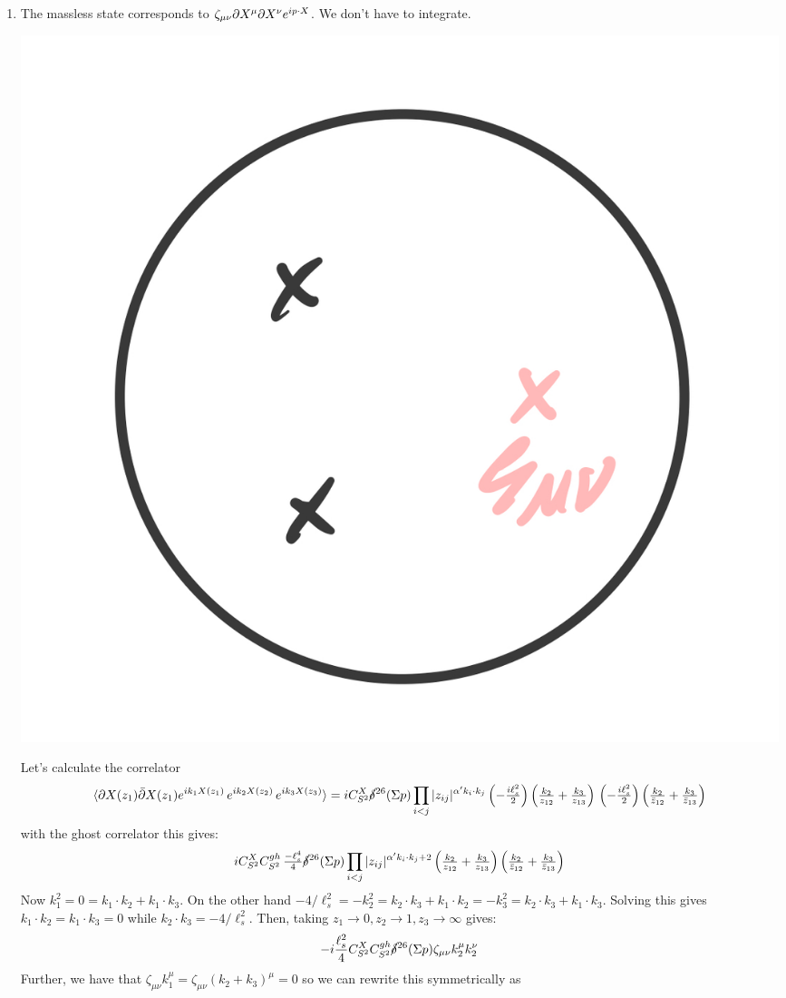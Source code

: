 \documentclass[11pt, class=article, crop=false]{standalone}
\begin{document}
\begin{enumerate}
	
	\item The massless state corresponds to $\zeta_{\mu \nu} \partial X^\mu \partial X^\nu e^{i p \cdot X}$. We don't have to integrate. 
	\begin{center}
		\includegraphics[scale=0.1]{"Drawings/55"}
	\end{center}
	Let's calculate the correlator
	\[
		\braket{\partial X(z_1) \bar {\partial} X(z_1) e^{i k_1 X(z_1)}\,  e^{i k_2 X(z_2)} \,  e^{i k_3 X(z_3)} } 
		= i C_{S^2}^X \cancel\delta^{26}(\Sigma p) \prod_{i<j} |z_{ij}|^{\alpha' k_i \cdot k_j} \left(-\tfrac{i \ell_s^2}{2}\right) \left(\tfrac{k_2}{z_{12}} + \tfrac{k_3}{z_{13}}\right) \, \left(-\tfrac{i\ell_s^2}{2}\right) \left(\tfrac{k_2}{\bar z_{12}} + \tfrac{k_3}{\bar z_{13}}\right)
	\]
	with the ghost correlator this gives:
	\[
		i C_{S^2}^X C_{S^2}^{gh} \, \tfrac{-\ell_s^4}{4} \cancel\delta^{26}(\Sigma p) \prod_{i<j} |z_{ij}|^{\alpha' k_i \cdot k_j + 2} \left(\tfrac{k_2}{z_{12}} + \tfrac{k_3}{z_{13}}\right)  \left(\tfrac{k_2}{\bar z_{12}} + \tfrac{k_3}{\bar z_{13}}\right)
	\]
	Now $k_1^2 = 0 = k_1 \cdot k_2 + k_1 \cdot k_3$. On the other hand $-4/\ell_s^2 = -k_2^2 = k_2 \cdot k_3 + k_1 \cdot k_2 = -k_3^2 = k_2 \cdot k_3 + k_1 \cdot k_3$. Solving this gives $k_1 \cdot k_2 = k_1 \cdot k_3 = 0$ while $k_2 \cdot k_3 = -4/\ell_s^2$. Then, taking $z_1 \to 0, z_2 \to 1, z_3 \to \infty$ gives:
	\[
		-i \frac{\ell_s^2}{4} C_{S^2}^X C_{S^2}^{gh} \cancel\delta^{26}(\Sigma p) \zeta_{\mu \nu}k_2^\mu k_2^\nu
	\] 
	Further, we have that $\zeta_{\mu \nu} k_1^\mu = \zeta_{\mu \nu} (k_2 + k_3)^\mu = 0$ so we can rewrite this symmetrically as 

\end{enumerate}
\end{document}
